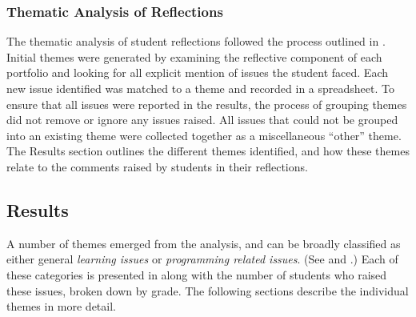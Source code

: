 
\subsubsection{Thematic Analysis of Reflections} %
\label{sub:thematic_analysis_of_reflections}

The thematic analysis of student reflections followed the process outlined in . Initial themes were generated by examining the reflective component of each portfolio and looking for all explicit mention of issues the student faced. Each new issue identified was matched to a theme and recorded in a spreadsheet. To ensure that all issues were reported in the results, the process of grouping themes did not remove or ignore any issues raised. All issues that could not be grouped into an existing theme were collected together as a miscellaneous ``other'' theme. The Results section outlines the different themes identified, and how these themes relate to the comments raised by students in their reflections.


\subsection{Results} %
\label{sec:issues_results}

A number of themes emerged from the analysis, and can be broadly classified as either general \emph{learning issues} or \emph{programming related issues}. (See  and .) Each of these categories is presented in  along with the number of students who raised these issues, broken down by grade. The following sections describe the individual themes in more detail.

